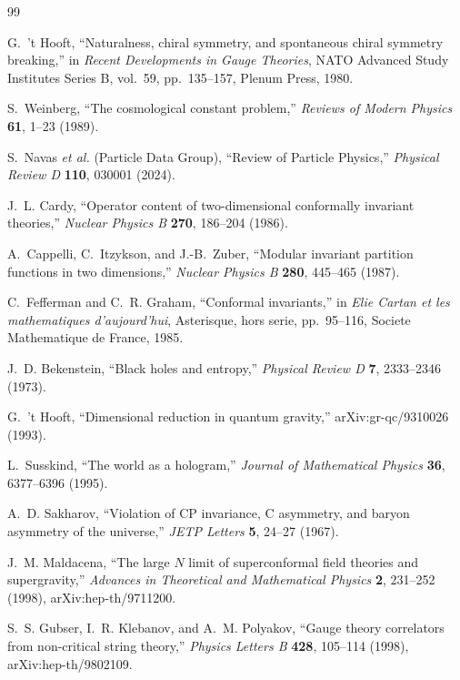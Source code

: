 \documentclass[11pt]{article}
\begin{document}
\begin{thebibliography}{99}

G.~'t Hooft,
``Naturalness, chiral symmetry, and spontaneous chiral symmetry breaking,'' in
\textit{Recent Developments in Gauge Theories}, NATO Advanced Study Institutes
Series B, vol.~59, pp.~135--157, Plenum Press, 1980.

S.~Weinberg,
``The cosmological constant problem,''
\textit{Reviews of Modern Physics} \textbf{61}, 1--23 (1989).

S.~Navas \textit{et al.} (Particle Data Group),
``Review of Particle Physics,''
\textit{Physical Review D} \textbf{110}, 030001 (2024).

J.~L. Cardy,
``Operator content of two-dimensional conformally invariant theories,''
\textit{Nuclear Physics B} \textbf{270}, 186--204 (1986).

A.~Cappelli, C.~Itzykson, and J.-B.~Zuber,
``Modular invariant partition functions in two dimensions,''
\textit{Nuclear Physics B} \textbf{280}, 445--465 (1987).

C.~Fefferman and C.~R. Graham,
``Conformal invariants,'' in
\textit{Elie Cartan et les mathematiques d'aujourd'hui},
Asterisque, hors serie, pp.~95--116, Societe Mathematique de France, 1985.

J.~D. Bekenstein,
``Black holes and entropy,''
\textit{Physical Review D} \textbf{7}, 2333--2346 (1973).

G.~'t Hooft,
``Dimensional reduction in quantum gravity,''
arXiv:gr-qc/9310026 (1993).

L.~Susskind,
``The world as a hologram,''
\textit{Journal of Mathematical Physics} \textbf{36}, 6377--6396 (1995).

A.~D. Sakharov,
``Violation of CP invariance, C asymmetry, and baryon asymmetry of the
universe,''
\textit{JETP Letters} \textbf{5}, 24--27 (1967).

J.~M. Maldacena,
``The large $N$ limit of superconformal field theories and supergravity,''
\textit{Advances in Theoretical and Mathematical Physics} \textbf{2},
231--252 (1998), arXiv:hep-th/9711200.

S.~S. Gubser, I.~R. Klebanov, and A.~M. Polyakov,
``Gauge theory correlators from non-critical string theory,''
\textit{Physics Letters B} \textbf{428}, 105--114 (1998),
arXiv:hep-th/9802109.


\end{thebibliography}
\end{document}
